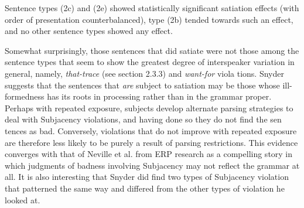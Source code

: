 \begin{styleStandard}
Sentence types (2c) and (2e) showed statistically significant satiation effects (with order of presentation counterbalanced), type (2b) tended towards such an effect, and no other sentence types showed any effect.
\end{styleStandard}


\begin{styleStandard}
Somewhat surprisingly, those sentences that did satiate were not those among the sentence types that seem to show the greatest degree of interspeaker variation in general, namely, \textit{that-trace}\textit{ }(see section 2.3.3) and \textit{want-for}\textit{ }viola\- tions. Snyder suggests that the sentences that \textit{are}\textit{ }subject to satiation may be those whose ill-formedness has its roots in processing rather than in the grammar proper. Perhaps with repeated exposure, subjects develop alternate parsing strategies to deal with Subjacency violations, and having done so they do not find the sen\- tences as bad. Conversely, violations that do not improve with repeated exposure are therefore less likely to be purely a result of parsing restrictions. This evidence converges with that of Neville et al. from ERP research as a compelling story in which judgments of badness involving Subjacency may not reflect the grammar at all. It is also interesting that Snyder did find two types of Subjacency violation that patterned the same way and differed from the other types of violation he looked at.
\end{styleStandard}


